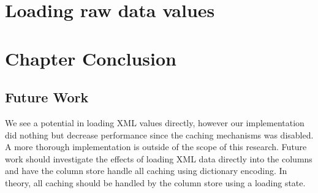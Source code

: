 \section{Loading raw data values}
\label{sec:Loading raw data values}

\section{Chapter Conclusion}
\label{sec:Chapter Conclusion}

\subsection{Future Work}
\label{sub:Future Work}
We see a potential in loading XML values directly, however our implementation did nothing but decrease performance since the caching mechanisms was disabled. A more thorough implementation is outside of the scope of this research. Future work should investigate the effects of loading XML data directly into the columns and have the column store handle all caching using dictionary encoding. In theory, all caching should be handled by the column store using a loading state.
